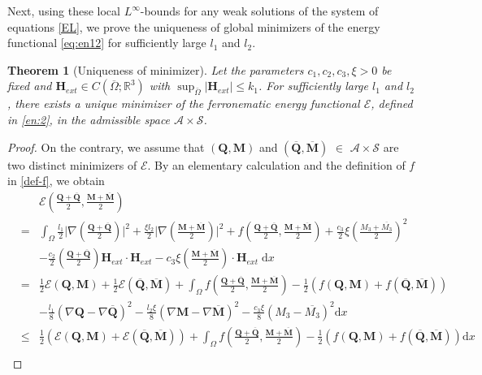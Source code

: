 \documentclass{article}
\newtheorem{theorem}{Theorem}[section]
\def\Qvec{\mathbf{Q}}
\def \Mvec{\mathbf{M}}
\def\Hvec{\mathbf{H}}
\def\d{\mathrm{d}}
\begin{document}
Next, using these local $L^\infty$-bounds for any weak solutions of the system of equations \eqref{EL}, we 
prove the uniqueness of global minimizers of the energy functional \eqref{eq:en12} for sufficiently large $l_1$ and $l_2$.
\begin{theorem}[Uniqueness of minimizer]\label{thm:2}
Let the parameters $c_1,c_2,c_3, \xi>0$ be fixed and $\Hvec_{ext}\in C\left(\overline{\Omega}; \mathbb R^3\right)$  with $\sup_{\bar{\Omega}}|\Hvec_{ext}|\le k_1$. For sufficiently large $l_1$ and $l_2$, there exists a unique minimizer of the ferronematic energy functional $\mathcal{E}$, defined in \eqref{en:2}, in the admissible space $\mathcal{A}\times\mathcal{S}$. 
\end{theorem}
\begin{proof}
On the contrary, we assume that $\left(\Qvec, \Mvec\right)$ and $\left(\overline{\Qvec}, \overline{\Mvec}\right)$ $\in$ $\mathcal{A}\times\mathcal{S}$ are two distinct minimizers of $\mathcal{E}$. By an elementary calculation and the definition of $f$ in \eqref{def-f}, we obtain
\begin{eqnarray}
& &\mathcal{E}\left(\frac{\Qvec+\overline{\Qvec}}{2}, \frac{\Mvec+\overline{\Mvec}}{2}\right)\nonumber\\
&=&\int_{\Omega}\frac{l_1}{2}\bigg|\nabla\left(\frac{\Qvec+\overline{\Qvec}}{2}\right)\bigg|^2 + \frac{\xi l_2}{2}\bigg|\nabla\left(\frac{\Mvec+\overline{\Mvec}}{2}\right)\bigg|^2 + f\left(\frac{\Qvec+\overline{\Qvec}}{2}, \frac{\Mvec+\overline{\Mvec}}{2}\right)+\frac{c_3}{2}\xi\left(\frac{M_3+\overline{M_3}}{2}\right)^2\nonumber\\
& &- \frac{c_2}{2}\left(\frac{\Qvec+\overline{\Qvec}}{2}\right)\Hvec_{ext}\cdot\Hvec_{ext} 
- c_3\xi\left(\frac{\Mvec+\overline{\Mvec}}{2}\right)\cdot\Hvec_{ext}\;\d x\nonumber\\
&=&\frac{1}{2}\mathcal{E}\left(\Qvec, \Mvec\right) + \frac{1}{2}\mathcal{E}\left(\overline{\Qvec}, \overline{\Mvec}\right) + \int_{\Omega}f\left(\frac{\Qvec+\overline{\Qvec}}{2}, \frac{\Mvec+\overline{\Mvec}}{2}\right)-\frac{1}{2}\left(f\left(\Qvec, \Mvec\right) + f\left(\overline{\Qvec}, \overline{\Mvec}\right)\right)\nonumber\\
& &- \frac{l_1}{8}\left(\nabla\Qvec-\nabla\overline{\Qvec}\right)^2-\frac{l_2\xi}{8}\left(\nabla\Mvec-\nabla\overline{\Mvec}\right)^2 - \frac{c_3\xi}{8}\left(M_3-\overline{M_3}\right)^2\d x\nonumber\\
&\le&\frac{1}{2}\left(\mathcal{E}\left(\Qvec, \Mvec\right) + \mathcal{E}\left(\overline{\Qvec}, \overline{\Mvec}\right)\right)+\int_{\Omega}f\left(\frac{\Qvec+\overline{\Qvec}}{2}, \frac{\Mvec+\overline{\Mvec}}{2}\right)-\frac{1}{2}\left(f\left(\Qvec, \Mvec\right) + f\left(\overline{\Qvec}, \overline{\Mvec}\right)\right)\d x\nonumber\\

\end{eqnarray}
\end{proof}
\end{document}
